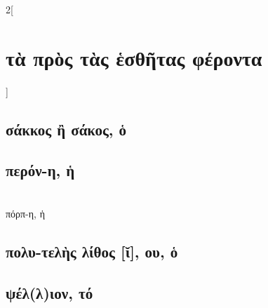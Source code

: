 \documentclass{book}
\begin{document}
\begin{multicols}{2}[\section{τὰ πρὸς τὰς ἑσθῆτας φέροντα}]
\subsection{σάκκος ἢ σάκος, ὁ}
\subsection{περόν-η, ἡ}  ~\\
πόρπ-η, ἡ  
\subsection{πολυ-τελὴς λίθος [ῐ], ου, ὁ}
\subsection{ψέλ(λ)ιον, τό}

~
\end{multicols}
\newpage
\end{document}

